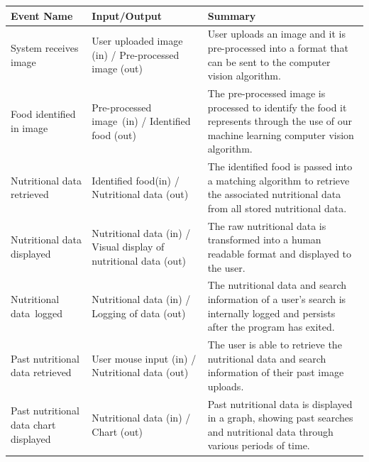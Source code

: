 \documentclass[12pt]{article}
\begin{document}
\begin{tabular}{ |p{5cm}|p{4cm}|p{6.5cm}| }
\hline
\textbf{Event Name}                   & \textbf{Input/Output}                                            & \textbf{Summary}                                                                                                                            \\ 
\hline
System receives image                 & User uploaded image (in) / Pre-processed image (out)             & User uploads an image and it is pre-processed into a format that can be sent to the computer vision algorithm.                              \\ 
\hline
Food identified in image              & Pre-processed image~(in) / Identified food (out)                 & The pre-processed image is processed to identify the food it represents through the use of our machine learning computer vision algorithm.  \\ 
\hline
Nutritional data retrieved            & Identified food(in) / Nutritional data (out)                     & The identified food is passed into a matching algorithm to retrieve the associated nutritional data from all stored nutritional data.       \\ 
\hline
Nutritional data displayed            & Nutritional data (in) / Visual display of nutritional data (out) & The raw nutritional data is transformed into a human readable format and displayed to the user.                                             \\ 
\hline
Nutritional data~logged               & Nutritional data (in) / Logging of data (out)                    & The nutritional data and search information of a user's search is internally logged and persists after the program has exited.              \\ 
\hline
Past nutritional data retrieved       & User mouse input (in) / Nutritional data (out)                   & The user is able to retrieve the nutritional data and search information of their past image uploads.                                       \\ 
\hline
Past nutritional data chart displayed & Nutritional data (in) / Chart (out)                              & Past nutritional data is displayed in a graph, showing past searches and nutritional data through various periods of time.                  \\
\hline
\end{tabular}
\end{document}
